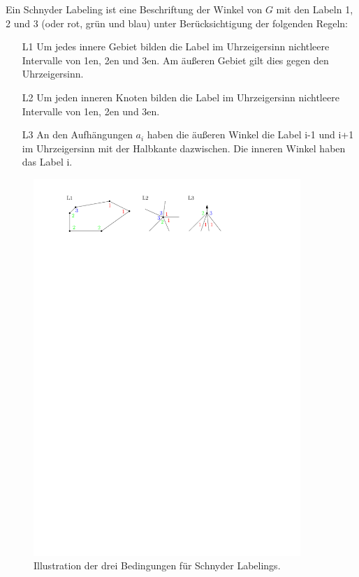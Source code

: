 \begin{definition}\label{def_sl}
Ein Schnyder Labeling ist eine Beschriftung der Winkel von $G$ mit den Labeln 1, 2 und 3 (oder rot, grün und blau) unter Berücksichtigung der folgenden Regeln:
\begin{itemize}
\item[L1] Um jedes innere Gebiet bilden die Label im Uhrzeigersinn nichtleere Intervalle von 1en, 2en und 3en. Am äußeren Gebiet gilt dies gegen den Uhrzeigersinn.
\item[L2] Um jeden inneren Knoten bilden die Label im Uhrzeigersinn nichtleere Intervalle von 1en, 2en und 3en.
\item[L3] An den Aufhängungen $a_i$ haben die äußeren Winkel die Label i-1 und i+1 im Uhrzeigersinn mit der Halbkante dazwischen. Die inneren Winkel haben das Label i.
\end{itemize} 
\begin{figure}[h]
	\centering
  \includegraphics[width=0.9\textwidth]{schnyder_label_def.pdf}
   \caption{Illustration der drei Bedingungen für Schnyder Labelings.}
\end{figure}
\end{definition}

